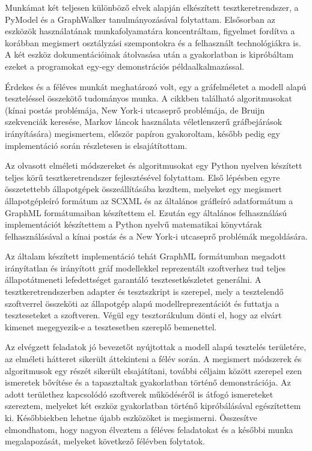 \documentclass{article}
\begin{document}
Munkámat két teljesen különböző elvek alapján elkészített tesztkeretrendszer, a PyModel és a GraphWalker tanulmányozásával folytattam. Elsősorban az eszközök használatának munkafolyamatára koncentráltam, figyelmet fordítva a korábban megismert osztályzási szempontokra és a felhasznált technológiákra is. A két eszköz dokumentációinak átolvasása után a gyakorlatban is kipróbáltam ezeket a programokat egy-egy demonstrációs példaalkalmazással.

Érdekes és a féléves munkát meghatározó volt, egy a gráfelméletet a modell alapú teszteléssel összekötő tudományos munka. A cikkben található algoritmusokat (kínai postás problémája, New York-i utcaseprő problémája, de Bruijn szekvenciák keresése, Markov láncok használata véletlenszerű gráfbejárások irányítására) megismertem, először papíron gyakoroltam, később pedig egy implementáció során részletesen is elsajátítottam.

Az olvasott elméleti módszereket és algoritmusokat egy Python nyelven készített teljes körű tesztkeretrendszer fejlesztésével folytattam. Első lépésben egyre összetettebb állapotgépek összeállításába kezdtem, melyeket egy megismert állapotgépleíró formátum az SCXML és az általános gráfleíró adatformátum a GraphML formátumaiban készítettem el. Ezután egy általános felhasználású implementációt készítettem a Python nyelvű matematikai könyvtárak felhasználásával a kínai postás és a New York-i utcaseprő problémák megoldására.

Az általam készített implementáció tehát GraphML formátumban megadott irányítatlan és irányított gráf modellekkel reprezentált szoftverhez tud teljes állapotátmeneti lefedettséget garantáló tesztesetkészletet generálni. A tesztkeretrendszerben adapter és tesztszkript is szerepel, mely a tesztelendő szoftverrel összeköti az állapotgép alapú modellreprezentációt és futtatja a teszteseteket a szoftveren. Végül egy tesztorákulum dönti el, hogy az elvárt kimenet megegyezik-e a tesztesetben szereplő bemenettel.

Az elvégzett feladatok jó bevezetőt nyújtottak a modell alapú tesztelés területére, az elméleti hátteret sikerült áttekinteni a félév során. A megismert módszerek és algoritmusok egy részét sikerült elsajátítani, további céljaim között szerepel ezen ismeretek bővítése és a tapasztaltak gyakorlatban történő demonstrációja. Az adott területhez kapcsolódó szoftverek működéséről is átfogó ismereteket szereztem, melyeket két eszköz gyakorlatban történő kipróbálásával egészítettem ki. Későbbiekben lehetne újabb eszközöket is megismerni. Összesítve elmondhatom, hogy nagyon élveztem a féléves feladatokat és a későbbi munka megalapozását, melyeket következő félévben folytatok.
\end{document}
